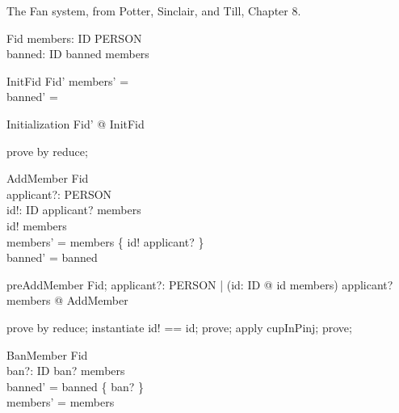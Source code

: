 \documentclass{article}
\begin{document}
The Fan system, from Potter, Sinclair, and Till, Chapter 8.

\begin{zed}
  [PERSON, ID]
\end{zed}

\begin{schema}{Fid}
  members: ID \pinj PERSON \\
  banned: \power ID
\where
  banned \subseteq \dom members
\end{schema}

\begin{schema}{InitFid}
  Fid'
\where
  members' = \emptyset \\
  banned' = \emptyset
\end{schema}

\begin{theorem}{Initialization}
  \exists Fid' @ InitFid
\end{theorem}

\begin{zproof}
prove by reduce;
\end{zproof}

\begin{schema}{AddMember}
  \Delta Fid \\
  applicant?: PERSON \\
  id!: ID
\where
  applicant? \notin \ran members \\
  id! \notin \dom members \\
  members' = members \cup \{ id! \mapsto applicant? \} \\
  banned' = banned 
\end{schema}

\begin{theorem}{preAddMember}
\forall Fid; applicant?: PERSON
    | (\exists id: ID @ id \notin \dom members) \land
      applicant? \notin \ran members
    @ \pre AddMember
\end{theorem}

\begin{zproof}
prove by reduce;
instantiate id! == id;
prove;
apply cupInPinj;
prove;
\end{zproof}

\begin{schema}{BanMember}
  \Delta Fid \\
  ban?: ID
\where
  ban? \in \dom members \\
  banned' = banned \cup \{ ban? \} \\
  members' = members
\end{schema}
\end{document}
